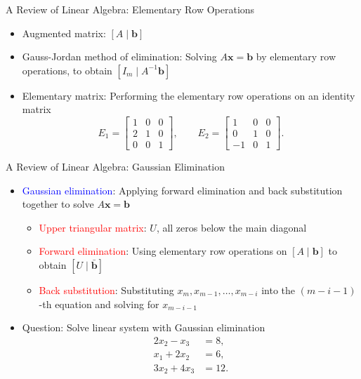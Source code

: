\documentclass[aspectratio=169,hyperref,UTF8,CJK]{beamer}
\newcommand{\vect}[1]{\boldsymbol{#1}}
\begin{document}
\begin{frame}{A Review of Linear Algebra: Elementary Row Operations}
  \small
  \begin{itemize}
    \item Augmented matrix: $[A\mid\vect{b}]$
    \item Gauss-Jordan method of elimination: Solving $A\vect{x}=\vect{b}$ by elementary row operations, to obtain $[I_m\mid A^{-1}\vect{b}]$
    \item Elementary matrix: Performing the elementary row operations on an identity matrix
      \begin{equation*}
        E_1=\begin{bmatrix}1&0&0\\2&1&0\\0&0&1\end{bmatrix},
        \qquad
        E_2=\begin{bmatrix}1&0&0\\0&1&0\\-1&0&1\end{bmatrix}.
      \end{equation*}
  \end{itemize}
\end{frame}

\begin{frame}{A Review of Linear Algebra: Gaussian Elimination}
  \small
  \begin{itemize}
    \item \textcolor{blue}{Gaussian elimination}: Applying forward elimination and back substitution together to solve $A\vect{x}=\vect{b}$
      \begin{itemize}
        \item \textcolor{red}{Upper triangular matrix}: $U$, all zeros below the main diagonal
        \item \textcolor{red}{Forward elimination}: Using elementary row operations on $[A\mid\vect{b}]$ to obtain $[U\mid\bar{\vect{b}}]$
        \item \textcolor{red}{Back substitution}: Substituting $x_m,x_{m-1},\ldots,x_{m-i}$ into the $(m-i-1)$-th equation and solving for $x_{m-i-1}$
      \end{itemize}
    \item Question: Solve linear system with Gaussian elimination
      \begin{align*}
        2x_2-x_3&=8,\\
        x_1+2x_2&=6,\\
        3x_2+4x_3&=12.
      \end{align*}
  \end{itemize}
\end{frame}
\end{document}
